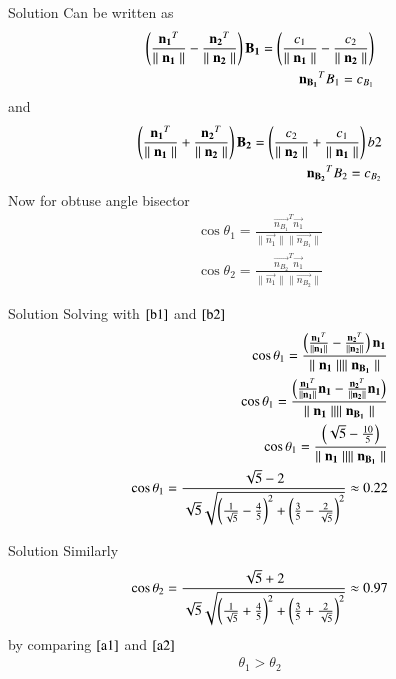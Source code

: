 \documentclass{beamer}
\begin{document}
\begin{frame}{Solution}
Can be written as
\begin{align}
    \left(\frac{\mathbf{n_1}^T}{\parallel\mathbf{n_1}\parallel} - \frac{\mathbf{n_2}^T}{\parallel\mathbf{n_2}\parallel}\right)\mathbf{B_1}=\left(\frac{c_1}{\parallel\mathbf{n_1}\parallel} - \frac{c_2}{\parallel\mathbf{n_2}\parallel}\right)\label{b1} \\
    \mathbf{n_{B_1}}^TB_1=c_{B_1} \label{b1}
\end{align}
and
\begin{align}
    \left(\frac{\mathbf{n_1}^T}{\parallel\mathbf{n_1}\parallel} + \frac{\mathbf{n_2}^T}{\parallel\mathbf{n_2}\parallel}\right)\mathbf{B_2}=\left(\frac{c_2}{\parallel\mathbf{n_2}\parallel} + \frac{c_1}{\parallel\mathbf{n_1}\parallel}\right) {b2}\\
    \mathbf{n_{B_2}}^TB_2=c_{B_2} \label{b2}
\end{align}
Now for obtuse angle bisector
\begin{align}
    \cos\theta_1=\frac{\vec{n_{B_1}}^T\vec{n_1}}{\parallel\vec{n_1}\parallel\parallel\vec{n_{B_1}}\parallel}\\
    \cos\theta_2=\frac{\vec{n_{B_2}}^T\vec{n_1}}{\parallel\vec{n_1}\parallel\parallel\vec{n_{B_2}}\parallel}
\end{align}
\end{frame}
\begin{frame}{Solution}
Solving with $\eqref{b1}$ and $\eqref{b2}$
\begin{align}
    \cos\theta_1=\frac{\left(\frac{\mathbf{n_1}^T}{\parallel\mathbf{n_1}\parallel} - \frac{\mathbf{n_2}^T}{\parallel\mathbf{n_2}\parallel}\right)\mathbf{n_1}}{\parallel\mathbf{n_1}\parallel\parallel\mathbf{n_{B_1}}\parallel}\\
    \cos\theta_1=\frac{\left(\frac{\mathbf{n_1}^T}{\parallel\mathbf{n_1}\parallel}\mathbf{n_1} - \frac{\mathbf{n_2}^T}{\parallel\mathbf{n_2}\parallel}\mathbf{n_1}\right)}{\parallel\mathbf{n_1}\parallel\parallel\mathbf{n_{B_1}}\parallel}\\
    \cos\theta_1=\frac{\left(\sqrt{5} - \frac{10}{5}\right)}{\parallel\mathbf{n_1}\parallel\parallel\mathbf{n_{B_1}}\parallel}\\
    \cos\theta_1=\frac{\sqrt{5}-2}{\sqrt{5}\sqrt{\left(\frac{1}{\sqrt{5}}-\frac{4}{5}\right)^2+\left(\frac{3}{5}-\frac{2}{\sqrt{5}}\right)^2}}\approx 0.22 \label{a1}
\end{align}
\end{frame}
\begin{frame}{Solution}
Similarly
\begin{align}
    \cos\theta_2=\frac{\sqrt{5}+2}{\sqrt{5}\sqrt{\left(\frac{1}{\sqrt{5}}+\frac{4}{5}\right)^2+\left(\frac{3}{5}+\frac{2}{\sqrt{5}}\right)^2}}\approx 0.97\label{a2}
\end{align}
by comparing $\eqref{a1}$ and $\eqref{a2}$
\begin{align}
    \theta_1>\theta_2
\end{align}
\end{frame}
\end{document}

